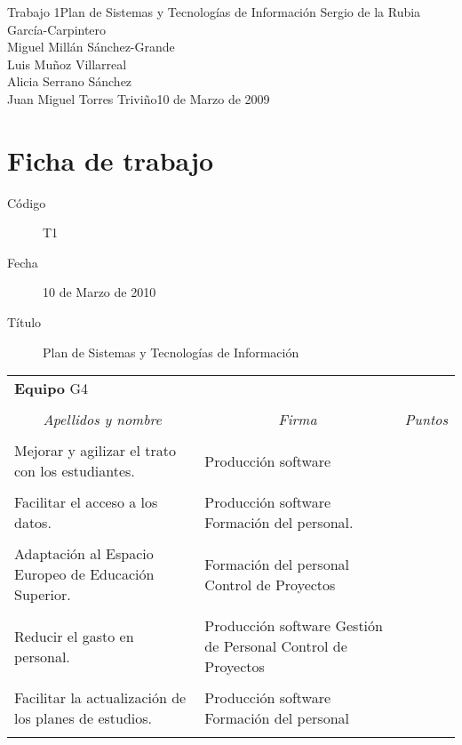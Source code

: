 \documentclass[11pt,a4paper,spanish,twoside]{book}
\begin{document}
{Trabajo 1}{Plan de Sistemas y Tecnologías de Información}
{Sergio de la Rubia García-Carpintero\\Miguel Millán Sánchez-Grande\\
  Luis Muñoz Villarreal\\Alicia Serrano Sánchez\\
  Juan Miguel Torres Triviño}{10 de Marzo de 2009}


\tableofcontents

\chapter*{Ficha de trabajo}
\begin{description}
\item[Código] T1
\item[Fecha] 10 de Marzo de 2010
\item[Título]Plan de Sistemas y Tecnologías de Información
\end{description}

\begin{table}[!ht]
  \centering
  \begin{tabular}{lp{5cm}c}
    \multicolumn{3}{l}{\Large \textbf{Equipo} G4} \\ \\
    \multicolumn{1}{c}{\emph{Apellidos y nombre}} & 
    \multicolumn{1}{c}{\emph{Firma}} & \emph{Puntos} \\
    \hline \\
    Mejorar y agilizar el trato con los estudiantes.         & Producción software \\ \\
    Facilitar el acceso a los datos.         & Producción software Formación del personal. \\ \\
    Adaptación al Espacio Europeo de Educación Superior.         & Formación del personal Control de Proyectos \\ \\
    Reducir el gasto en personal.         & Producción software Gestión de Personal Control de Proyectos\\ \\
    Facilitar la actualización de los planes de estudios.         & Producción software Formación del personal \\ \\
    \hline
  \end{tabular}
\end{table}
\end{document}
